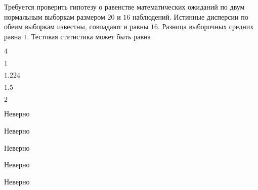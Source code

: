 
\begin{question}
Требуется проверить гипотезу о равенстве математических ожиданий по двум
нормальным выборкам размером \(20\) и \(16\) наблюдений. Истинные
дисперсии по обеим выборкам известны, совпадают и равны \(16\). Разница
выборочных средних равна \(1\). Тестовая статистика может быть равна
\begin{answerlist}
  \item \(4\)
  \item \(1\)
  \item \(1.224\)
  \item \(1.5\)
  \item \(2\)
\end{answerlist}
\end{question}

\begin{solution}
\begin{answerlist}
  \item Неверно
  \item Неверно
  \item Неверно
  \item Неверно
  \item Неверно
\end{answerlist}
\end{solution}

